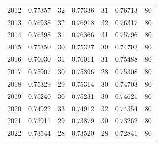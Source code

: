 \begin{table}[H]
{\begin{tabular}{@{}c|cccccc@{}}
			2012 & 0.77357 & 32 & 0.77336 & 31 & 0.76713 & 80 \\
			2013 & 0.76938 & 32 & 0.76918 & 32 & 0.76317 & 80 \\
			2014 & 0.76398 & 31 & 0.76366 & 31 & 0.75796 & 80 \\
			2015 & 0.75350 & 30 & 0.75327 & 30 & 0.74792 & 80 \\
			2016 & 0.76030 & 31 & 0.76011 & 31 & 0.75488 & 80 \\
			2017 & 0.75907 & 30 & 0.75896 & 28 & 0.75308 & 80 \\
			2018 & 0.75329 & 29 & 0.75314 & 30 & 0.74703 & 80 \\
			2019 & 0.75240 & 30 & 0.75231 & 30 & 0.74621 & 80 \\
			2020 & 0.74922 & 33 & 0.74912 & 32 & 0.74354 & 80 \\
			2021 & 0.73911 & 29 & 0.73879 & 30 & 0.73262 & 80 \\
			2022 & 0.73544 & 28 & 0.73520 & 28 & 0.72841 & 80 \\ \bottomrule
		\end{tabular}%
	}
\end{table}
